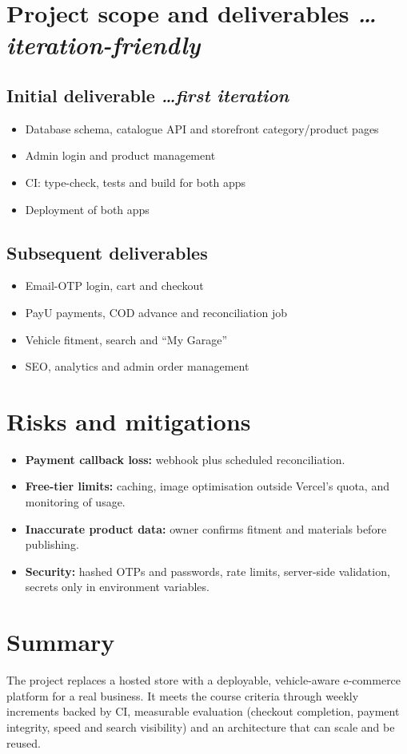 \documentclass[11pt,a4paper]{article}
\newcommand{\BvrHint}[1]{%
  {\normalfont\normalsize\itshape\hfill #1}}
\begin{document}
\section{Project scope and deliverables %
\BvrHint{\ldots iteration-friendly}}
\subsection{Initial deliverable %
\BvrHint{\ldots first iteration}}
\begin{itemize}[leftmargin=0.7cm]
    \item Database schema, catalogue API and storefront category/product pages
    \item Admin login and product management
    \item CI: type-check, tests and build for both apps
    \item Deployment of both apps
\end{itemize}

\subsection{Subsequent deliverables}
\begin{itemize}[leftmargin=0.7cm]
    \item Email-OTP login, cart and checkout
    \item PayU payments, COD advance and reconciliation job
    \item Vehicle fitment, search and ``My Garage''
    \item SEO, analytics and admin order management
\end{itemize}

\section{Risks and mitigations}
\begin{itemize}[leftmargin=0.7cm]
    \item \textbf{Payment callback loss:} webhook plus scheduled reconciliation.
    \item \textbf{Free-tier limits:} caching, image optimisation outside Vercel's
          quota, and monitoring of usage.
    \item \textbf{Inaccurate product data:} owner confirms fitment and materials
          before publishing.
    \item \textbf{Security:} hashed OTPs and passwords, rate limits, server-side
          validation, secrets only in environment variables.
\end{itemize}

\section{Summary}
The project replaces a hosted store with a deployable, vehicle-aware
e-commerce platform for a real business. It meets the course criteria through
weekly increments backed by CI, measurable evaluation (checkout completion,
payment integrity, speed and search visibility) and an architecture that can
scale and be reused.
\end{document}
